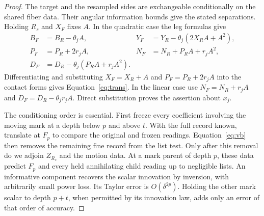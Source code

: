 \begin{proof}
The target and the resampled sides are exchangeable
conditionally on the shared fiber data. Their angular
information bounds give the stated separations.
Holding $R_s$ and $X_F$ fixes $A$. In the quadratic
case the leg formulas give
\[
 \begin{aligned}
 B_F&=B_R-\theta_jA,&
 Y_F&=Y_R-\theta_j(2X_RA+A^2),\\
 P_F&=P_R+2r_jA,&
 N_F&=N_R+P_RA+r_jA^2,\\
 D_F&=D_R-\theta_j(P_RA+r_jA^2).
 \end{aligned}
\]
Differentiating and substituting $X_F=X_R+A$ and
$P_F=P_R+2r_jA$ into the contact forms gives
Equation~\eqref{eq:trans}. In the linear case use
$N_F=N_R+r_jA$ and $D_F=D_R-\theta_jr_jA$.
Direct substitution proves the assertion about $x_j$.

The conditioning order is essential. First freeze every
coefficient involving the moving mark at a depth below
$p$ and above $t$. With the full record known, translate
at $F_p$ to compare the original and frozen readings.
Equation~\eqref{eq:vb} then removes the remaining fine
record from the list test. Only after this removal do
we adjoin $Z_{R_s}$ and the motion data. At a mark parent
of depth $p$, these data predict $F_p$ and every held
annihilating child reading up to negligible lists.
An informative component recovers the scalar innovation
by inversion, with arbitrarily small power loss. Its
Taylor error is $O(\delta^{2p})$. Holding the other
mark scalar to depth $p+t$, when permitted by its
innovation law, adds only an error of that order
of accuracy.


\end{proof}
